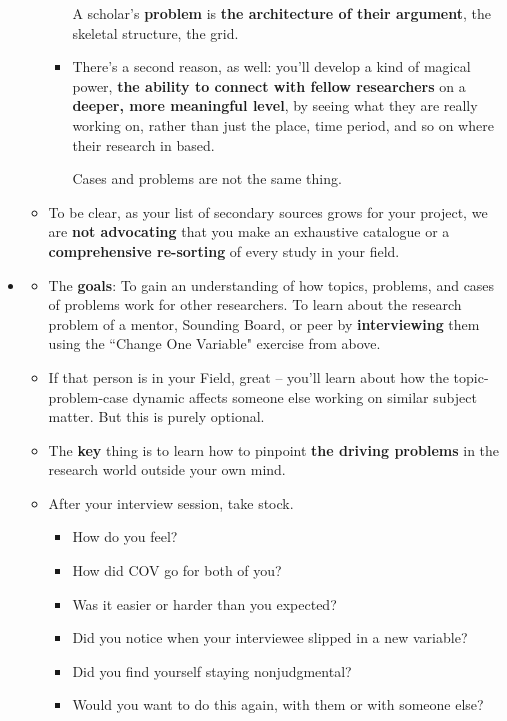 \documentclass[11pt]{article}
\begin{document}
\begin{itemize}
\begin{exercise}
\begin{itemize}
\begin{itemize}
A scholar’s \textbf{problem} is \textbf{the architecture of their argument}, the skeletal structure, the grid. 

\item There’s a second reason, as well: you’ll develop a kind of magical power, \textbf{the ability to connect with fellow researchers} on a \textbf{deeper, more meaningful level}, by seeing what they are really working on, rather than just the place, time period, and so on where their research in based. 

Cases and problems are not the same thing.
\end{itemize}

\item To be clear, as your list of secondary sources grows for your project, we are \textbf{not advocating} that you make an exhaustive catalogue or a \textbf{comprehensive re-sorting} of every study in your field. 
\end{itemize}
\end{exercise}

\item  \begin{exercise}
\begin{itemize}
\item The \textbf{goals}: To gain an understanding of how topics, problems, and cases of problems work for other researchers. To learn about the research problem of a mentor, Sounding Board, or peer by \textbf{interviewing} them using the ``Change One Variable" exercise from above.

\item If that person is in your Field, great -- you’ll learn about how the topic-problem-case dynamic affects someone else working on similar subject matter. But this is purely optional.

\item The \textbf{key} thing is to learn how to pinpoint \textbf{the driving problems} in the research world outside your own mind. 

\item After your interview session, take stock. 
\begin{itemize}
\item How do you feel?
\item How did COV go for both of you? 
\item Was it easier or harder than you expected? 
\item Did you notice when your interviewee slipped in a new variable?
\item Did you find yourself staying nonjudgmental? 
\item Would you want to do this again, with them or with someone else?
\end{itemize}


\end{itemize}
\end{exercise}
\end{itemize}
\end{document}
